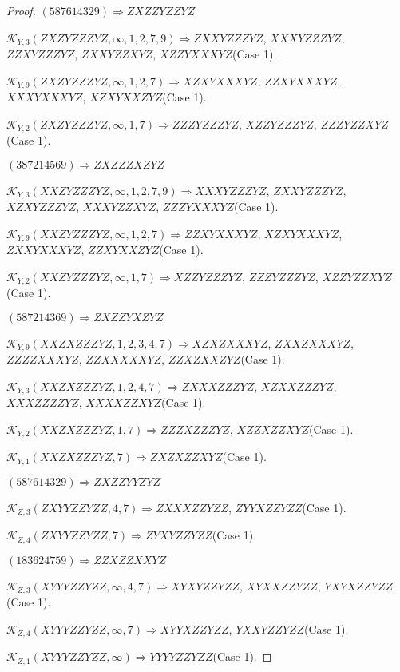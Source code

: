 \documentclass[12pt]{article}
\theoremstyle{plain}
\theoremstyle{definition}
\theoremstyle{remark}
\newcommand{\fancy}[1]{\mathcal{#1}}
\def\K{\fancy{K}}
\begin{document}
\begin{proof}
	
	
	$(5 8 7 6 1 4 3 2 9)\Rightarrow ZXZZYZZYZ$
	
	
	$\K_{Y,3}(ZXZYZZZYZ,\infty,1, 2, 7, 9)\Rightarrow $$ZXXYZZZYZ$, $XXXYZZZYZ$, $ZZXYZZZYZ$, $ZXXYZZXYZ$, $XZZYXXXYZ$(Case 1).
	
	$\K_{Y,9}(ZXZYZZZYZ,\infty,1, 2, 7)\Rightarrow $$XZXYXXXYZ$, $ZZXYXXXYZ$, $XXXYXXXYZ$, $XZXYXXZYZ$(Case 1).
	
	$\K_{Y,2}(ZXZYZZZYZ,\infty,1, 7)\Rightarrow $$ZZZYZZZYZ$, $XZZYZZZYZ$, $ZZZYZZXYZ$(Case 1).
	
	
	
	$(3 8 7 2 1 4 5 6 9)\Rightarrow ZXZZZXZYZ$
	
	
	$\K_{Y,3}(XXZYZZZYZ,\infty,1, 2, 7, 9)\Rightarrow $$XXXYZZZYZ$, $ZXXYZZZYZ$, $XZXYZZZYZ$, $XXXYZZXYZ$, $ZZZYXXXYZ$(Case 1).
	
	$\K_{Y,9}(XXZYZZZYZ,\infty,1, 2, 7)\Rightarrow $$ZZXYXXXYZ$, $XZXYXXXYZ$, $ZXXYXXXYZ$, $ZZXYXXZYZ$(Case 1).
	
	$\K_{Y,2}(XXZYZZZYZ,\infty,1, 7)\Rightarrow $$XZZYZZZYZ$, $ZZZYZZZYZ$, $XZZYZZXYZ$(Case 1).
	
	
	
	$(5 8 7 2 1 4 3 6 9)\Rightarrow ZXZZYXZYZ$
	
	
	$\K_{Y,9}(XXZXZZZYZ,1, 2, 3, 4, 7)\Rightarrow $$XZXZXXXYZ$, $ZXXZXXXYZ$, $ZZZZXXXYZ$, $ZZXXXXXYZ$, $ZZXZXXZYZ$(Case 1).
	
	$\K_{Y,3}(XXZXZZZYZ,1, 2, 4, 7)\Rightarrow $$ZXXXZZZYZ$, $XZXXZZZYZ$, $XXXZZZZYZ$, $XXXXZZXYZ$(Case 1).
	
	$\K_{Y,2}(XXZXZZZYZ,1, 7)\Rightarrow $$ZZZXZZZYZ$, $XZZXZZXYZ$(Case 1).
	
	$\K_{Y,1}(XXZXZZZYZ,7)\Rightarrow $$ZXZXZZXYZ$(Case 1).
	
	
	
	$(5 8 7 6 1 4 3 2 9)\Rightarrow ZXZZYYZYZ$
	
	
	$\K_{Z,3}(ZXYYZZYZZ,4, 7)\Rightarrow $$ZXXXZZYZZ$, $ZYYXZZYZZ$(Case 1).
	
	$\K_{Z,4}(ZXYYZZYZZ,7)\Rightarrow $$ZYXYZZYZZ$(Case 1).
	
	
	
	$(1 8 3 6 2 4 7 5 9)\Rightarrow ZZXZZXXYZ$
	
	
	$\K_{Z,3}(XYYYZZYZZ,\infty,4, 7)\Rightarrow $$XYXYZZYZZ$, $XYXXZZYZZ$, $YXYXZZYZZ$(Case 1).
	
	$\K_{Z,4}(XYYYZZYZZ,\infty,7)\Rightarrow $$XYYXZZYZZ$, $YXXYZZYZZ$(Case 1).
	
	$\K_{Z,1}(XYYYZZYZZ,\infty)\Rightarrow $$YYYYZZYZZ$(Case 1).
	

\end{proof}
\end{document}
